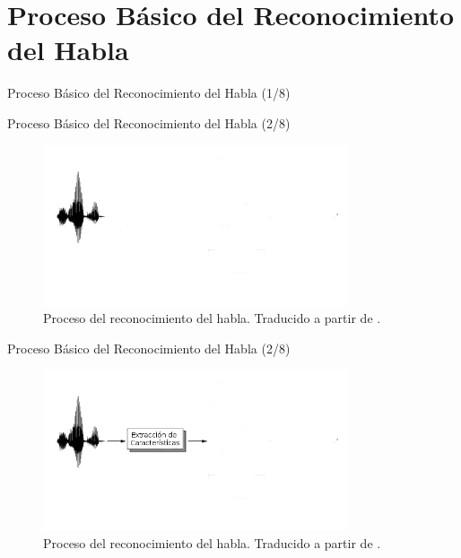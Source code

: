 \section{Proceso B\'asico del Reconocimiento del Habla}

\begin{frame}{Proceso B\'asico del Reconocimiento del Habla (1/8)}

\end{frame}

\begin{frame}{Proceso B\'asico del Reconocimiento del Habla (2/8)}

\begin{figure}[H] 
\centering
\includegraphics[width=0.8\textwidth]{./graphics/proceso_00.png}
\caption{Proceso del reconocimiento del habla. Traducido a partir de \protect\cite{VerenichASR}.}
\label{figure:proceso}
\end{figure}
\end{frame}

\begin{frame}{Proceso B\'asico del Reconocimiento del Habla (2/8)}

\begin{figure}[H] 
\centering
\includegraphics[width=0.8\textwidth]{./graphics/proceso_0.png}
\caption{Proceso del reconocimiento del habla. Traducido a partir de \protect\cite{VerenichASR}.}
\label{figure:proceso}
\end{figure}
\end{frame}

